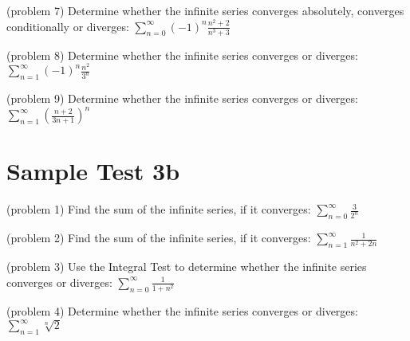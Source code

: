 \documentclass[handout]{ximera}
\begin{document}
\begin{problem}(problem 7)
Determine whether the infinite series converges absolutely, converges conditionally or diverges: $\displaystyle \sum_{n=0}^\infty (-1)^n \frac{n^2 + 2}{n^3 + 3}$

\end{problem}

\begin{problem}(problem 8)
Determine whether the infinite series converges or diverges: $\displaystyle \sum_{n=1}^\infty (-1)^n\frac{n^2}{3^n}$

\end{problem}


\begin{problem}(problem 9)
Determine whether the infinite series converges or diverges: $\displaystyle \sum_{n=1}^\infty \left(\frac{n+ 2}{3n+1}\right)^n$

\end{problem}



\section{Sample Test 3b}





\begin{problem}(problem 1)
Find the sum of the infinite series, if it converges: $\displaystyle \sum_{n=0}^\infty \frac{3}{2^n}$

\end{problem}


\begin{problem}(problem 2)
Find the sum of the infinite series, if it converges: $\displaystyle \sum_{n=1}^\infty \frac{1}{n^2 + 2n}$

\end{problem}

\begin{problem}(problem 3)
Use the Integral Test to determine whether the infinite series converges or diverges:  $\displaystyle \sum_{n=0}^\infty \frac{1}{1+n^2}$

\end{problem}

\begin{problem}(problem 4)
Determine whether the infinite series converges or diverges: $\displaystyle \sum_{n=1}^\infty \sqrt[n] 2$

\end{problem}
\end{document}
